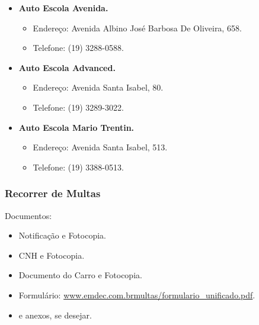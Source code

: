 \begin{itemize}
\item  \textbf{Auto Escola Avenida.}
    \begin{itemize}
        \item  Endereço: Avenida Albino José Barbosa De Oliveira, 658.
        \item  Telefone: (19) 3288-0588.
    \end{itemize}

\item  \textbf{Auto Escola Advanced.}
    \begin{itemize}
        \item  Endereço: Avenida Santa Isabel, 80.
        \item  Telefone: (19) 3289-3022.
    \end{itemize}

\item  \textbf{Auto Escola Mario Trentin.}
    \begin{itemize}
        \item  Endereço: Avenida Santa Isabel, 513.
        \item  Telefone: (19) 3388-0513.
    \end{itemize}
\end{itemize}

\subsubsection{Recorrer de Multas}

Documentos:
\begin{itemize}
\item  Notificação e Fotocopia.
\item  CNH e Fotocopia.
\item  Documento do Carro e Fotocopia.
\item  Formulário: \url{www.emdec.com.brmultas/formulario_unificado.pdf}.
\item  e anexos, se desejar.
\end{itemize}

